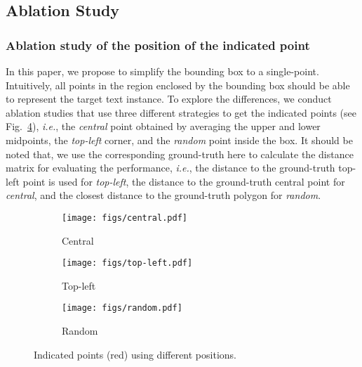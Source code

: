 \documentclass[sigconf]{acmart}
\begin{document}
\subsection{Ablation Study} 
\label{subsec:abs}
    
    
    
\subsubsection{Ablation study of the position of the indicated point}
In this paper, we propose to simplify the bounding box to a single-point. Intuitively, all points in the region enclosed by the bounding box should be able to represent the target text instance. To explore the differences, we conduct ablation studies that use three different strategies to get the indicated points (see Fig.~\ref{fig:pts_pos}), \emph{i.e.}, the \emph{central} point obtained by averaging the upper and lower midpoints, the \emph{top-left} corner, and the \emph{random} point inside the box. It should be noted that, we use the corresponding ground-truth here to calculate the distance matrix for evaluating the performance, \emph{i.e.}, the distance to the ground-truth top-left point is used for \emph{top-left}, the distance to the ground-truth central point for \emph{central}, and the closest distance to the ground-truth polygon for \emph{random}.
    
\begin{figure}[t!]
    \centering
    \begin{subfigure}{0.3\linewidth}
        \texttt{[image: figs/central.pdf]}
        \caption{Central}
        \label{fig:ctr}
    \end{subfigure}
    \begin{subfigure}{0.3\linewidth}
        \texttt{[image: figs/top-left.pdf]}
        \caption{Top-left}
        \label{fig:tl}
    \end{subfigure}
    \begin{subfigure}{0.3\linewidth}
        \texttt{[image: figs/random.pdf]}
        \caption{Random}
        \label{fig:rand}
    \end{subfigure}
    \caption{Indicated points (red) using different positions.}
    \label{fig:pts_pos}
\end{figure}
    
\end{document}
